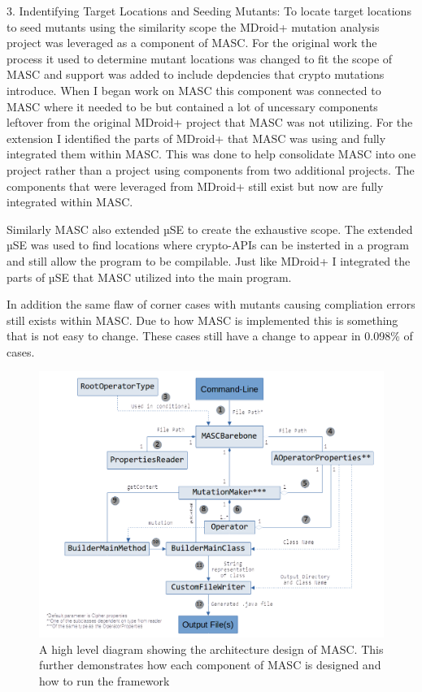 3. Indentifying Target Locations and Seeding Mutants: To locate target locations to seed mutants using the similarity scope the MDroid+ mutation analysis project was leveraged as a component of MASC. For the original work the process it used to determine mutant locations was changed to fit the scope of MASC and support was added to include depdencies that crypto mutations introduce. When I began work on MASC this component was connected to MASC where it needed to be but contained a lot of uncessary components leftover from the original MDroid+ project that MASC was not utilizing. For the extension I identified the parts of MDroid+ that MASC was using and fully integrated them within MASC. This was done to help consolidate MASC into one project rather than a project using components from two additional projects. The components that were leveraged from MDroid+ still exist but now are fully integrated within MASC.

Similarly MASC also extended µSE to create the exhaustive scope. The extended µSE was used to find locations where crypto-APIs can be insterted in a program and still allow the program to be compilable. Just like MDroid+ I integrated the parts of µSE that MASC utilized into the main program. 

In addition the same flaw of corner cases with mutants causing compliation errors still exists within MASC. Due to how MASC is implemented this is something that is not easy to change. These cases still have a change to appear in 0.098\% of cases.

\begin{figure}[!ht]
	\centering
    \includegraphics[width=0.96\linewidth]{figures/architecture.png}
	\vspace{-1.em}
    \caption{\small A high level diagram showing the architecture design of MASC. This further demonstrates how each component of MASC is designed and how to run the framework}
    \label{fig:taxonomy}
	
\end{figure}


